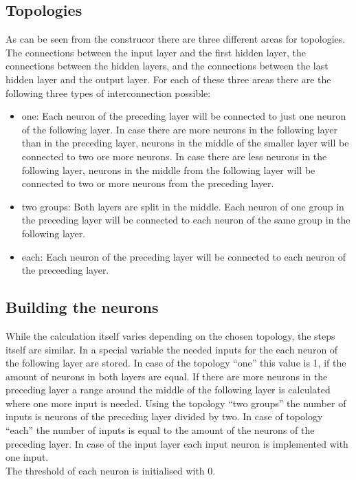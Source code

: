 \subsection{Topologies}
As can be seen from the construcor there are three different areas for topologies. The connections between the input layer and the first hidden layer, the connections between the hidden layers, and the connections between the last hidden layer and the output layer. For each of these three areas there are the following three types of interconnection possible:
\begin{itemize}
	\item one: Each neuron of the preceding layer will be connected to just one neuron of the following layer. In case there are more neurons in the following layer than in the preceding layer, neurons in the middle of the smaller layer will be connected to two ore more neurons. In case there are less neurons in the following layer, neurons in the middle from the following layer will be connected to two or more neurons from the preceding layer.\\
	\item two groups: Both layers are split in the middle. Each neuron of one group in the preceding layer will be connected to each neuron of the same group in the following layer.
	\item each: Each neuron of the preceding layer will be connected to each neuron of the preceeding layer.\\
\end{itemize}

\subsection{Building the neurons}
While the calculation itself varies depending on the chosen topology, the steps itself are similar. In a special variable the needed inputs for the each neuron of the following layer are stored. In case of the topology ``one'' this value is 1, if the amount of neurons in both layers are equal. If there are more neurons in the preceding layer a range around the middle of the following layer is calculated where one more input is needed. Using the topology ``two groups'' the number of inputs is neurons of the preceding layer divided by two. In case of topology ``each'' the number of inputs is equal to the amount of the neurons of the preceding layer. In case of the input layer each input neuron is implemented with one input.\\
The threshold of each neuron is initialised with 0.

